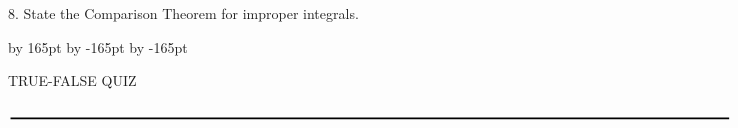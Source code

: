 \documentclass{sebase}
\begin{document}
\begin{multicols}{2}
\begin{ExerciseList}
\item[\hfill 8.] State the Comparison Theorem for improper integrals.

%
\end{ExerciseList}

\end{multicols}
\advance \leftskip by 165pt
\advance\hsize by -165pt
\advance\linewidth by -165pt%
\vspace*{-9pt}

TRUE-FALSE QUIZ\vspace{-18pt}

\vspace{12pt}\hskip-170pt\hfil%
\vspace{-6pt}$\rule{7.15in}{0.02in}$%
\vspace{12pt}\hfil%
\end{document}
